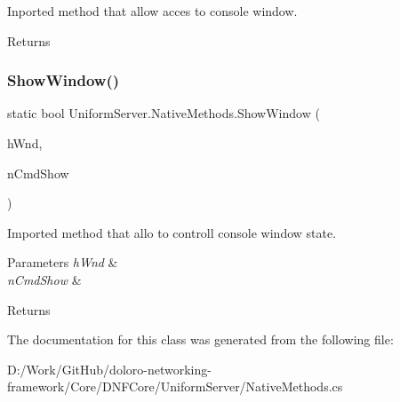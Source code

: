 Inported method that allow acces to console window. 

\begin{DoxyReturn}{Returns}

\end{DoxyReturn}
\mbox{\label{class_uniform_server_1_1_native_methods_aff29bbaf540e0aebe51ba9fd53576a86}} 
\subsubsection{\texorpdfstring{Show\+Window()}{ShowWindow()}}
{\footnotesize\ttfamily static bool Uniform\+Server.\+Native\+Methods.\+Show\+Window (\begin{DoxyParamCaption}\item[{Int\+Ptr}]{h\+Wnd,  }\item[{int}]{n\+Cmd\+Show }\end{DoxyParamCaption})}



Imported method that allo to controll console window state. 


\begin{DoxyParams}{Parameters}
{\em h\+Wnd} & \\
\hline
{\em n\+Cmd\+Show} & \\
\hline
\end{DoxyParams}
\begin{DoxyReturn}{Returns}

\end{DoxyReturn}


The documentation for this class was generated from the following file\+:\begin{DoxyCompactItemize}
\item 
D\+:/\+Work/\+Git\+Hub/doloro-\/networking-\/framework/\+Core/\+D\+N\+F\+Core/\+Uniform\+Server/Native\+Methods.\+cs\end{DoxyCompactItemize}
